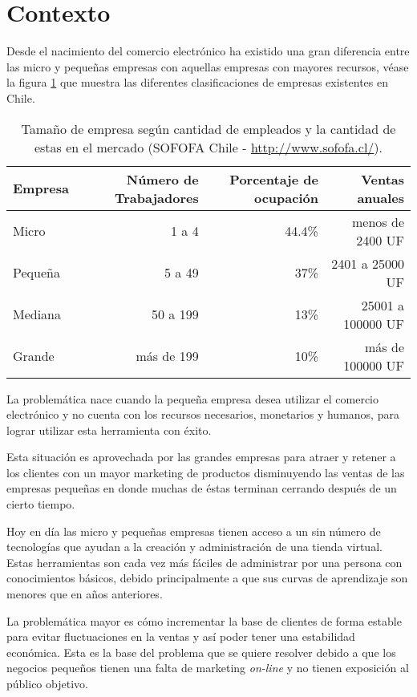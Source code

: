 \section{Contexto}

Desde el nacimiento del comercio electrónico ha existido una gran diferencia
entre las micro y pequeñas empresas con aquellas empresas con mayores recursos,
véase la figura \ref{tab:tam_empresa} que muestra las diferentes clasificaciones
de empresas existentes en Chile.

\begin{table}[h]
\footnotesize
\centering
\begin{tabular}{|l|r|r|r|}
\hline
{\bf Empresa}  & {\bf Número de Trabajadores} & {\bf Porcentaje de ocupación} & {\bf Ventas anuales}\\
\hline
Micro    & 1 a 4                & 44.4\%  & menos de 2400 UF\\
\hline
Pequeña  & 5 a 49               & 37\%  & 2401 a 25000 UF\\
\hline
Mediana  & 50 a 199             & 13\%  & 25001 a 100000 UF\\
\hline
Grande   & más de 199           & 10\%  & más de 100000 UF\\
\hline
\end{tabular}
\caption[Tamaño de empresa según cantidad de empleados y
la cantidad de estas en el mercado]{Tamaño de empresa según cantidad de empleados y
la cantidad de estas en el mercado (SOFOFA Chile - \url{http://www.sofofa.cl/}).}
\label{tab:tam_empresa}
\end{table}


La problemática nace cuando la pequeña empresa desea utilizar el comercio
electrónico y no cuenta con los recursos necesarios, monetarios y humanos,
para lograr utilizar esta herramienta con éxito.

Esta situación es aprovechada por las grandes empresas para atraer y retener a los
clientes con un mayor marketing de productos disminuyendo las ventas de las
empresas pequeñas en donde muchas de éstas terminan cerrando después de un cierto
tiempo.

Hoy en día las micro y pequeñas empresas tienen acceso a un sin número de
tecnologías que ayudan a la creación y administración de una tienda virtual.
Estas herramientas son cada vez más fáciles de administrar por una persona
con conocimientos básicos, debido principalmente a que sus curvas de aprendizaje
son menores que en años anteriores.

La problemática mayor es cómo incrementar la base de clientes de forma estable
para evitar fluctuaciones en la ventas y así poder tener una estabilidad económica.
Esta es la base del problema que se quiere resolver debido a que los negocios
pequeños tienen una falta de marketing \emph{on-line} y no tienen exposición al público
objetivo.

